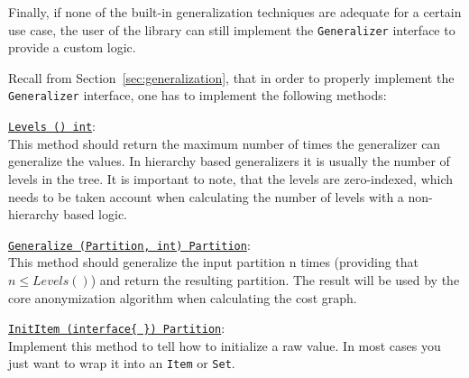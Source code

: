 Finally, if none of the built-in generalization techniques are adequate for a certain use case, the user of the library can still implement the \texttt{Generalizer} interface to provide a custom logic.

Recall from Section~\ref{sec:generalization}, that in order to properly implement the \texttt{Generalizer} interface, one has to implement the following methods:

\underline{\texttt{Levels () int}}: \\
This method should return the maximum number of times the generalizer can generalize the values. In hierarchy based generalizers it is usually the number of levels in the tree. It is important to note, that the levels are zero-indexed, which needs to be taken account when calculating the number of levels with a non-hierarchy based logic.

\underline{\texttt{Generalize (Partition, int) Partition}}: \\
This method should generalize the input partition n times (providing that \(n \le Levels ()\)) and return the resulting partition. The result will be used by the core anonymization algorithm when calculating the cost graph.

\underline{\texttt{InitItem (interface\{ \}) Partition}}: \\
Implement this method to tell how to initialize a raw value. In most cases you just want to wrap it into an \texttt{Item} or \texttt{Set}.